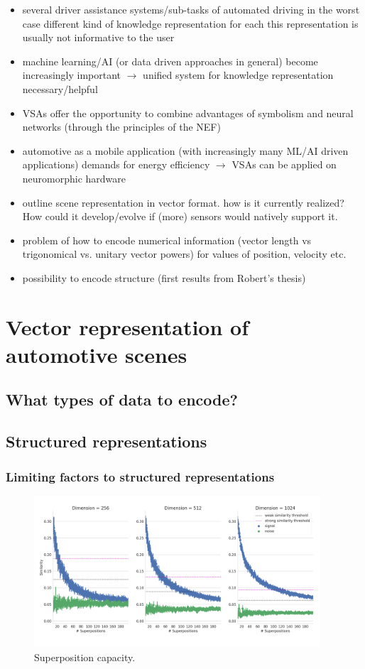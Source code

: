\begin{itemize}
	\item several driver assistance systems/sub-tasks of automated driving
	\subitem in the worst case different kind of knowledge representation for each
	\subitem this representation is usually not informative to the user

	\item machine learning/\ac{AI} (or data driven approaches in general) become increasingly important $\rightarrow$ unified system for knowledge representation necessary/helpful
	\item \aclp{VSA} offer the opportunity to combine advantages of symbolism and neural networks (through the principles of the \acf{NEF})
	\item automotive as a mobile application (with increasingly many ML/AI driven applications) demands for energy efficiency $\rightarrow$ \acp{VSA} can be applied on neuromorphic hardware
	\item outline scene representation in vector format. how is it currently realized? How could it develop/evolve if (more) sensors would natively support it.
	\item problem of how to encode numerical information (vector length vs trigonomical vs. unitary vector powers) for values of position, velocity etc.
	\item possibility to encode structure (first results from Robert's thesis)
\end{itemize}

\section{Vector representation of automotive scenes}
\subsection{What types of data to encode?}
\subsection{Structured representations}
\subsubsection{Limiting factors to structured representations}
\begin{figure}[t]
	\centering
	\includegraphics[width=0.95\textwidth]{imgs/spa_superposition_capacity.png}
	\caption{Superposition capacity.}
	\label{fig:spa_superposition_capacity}
\end{figure}

